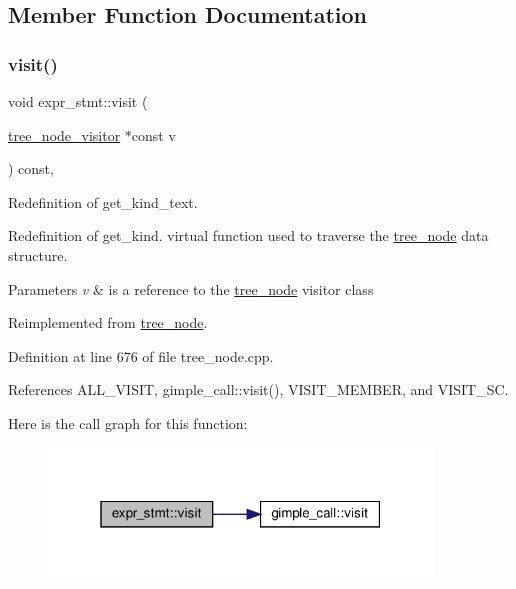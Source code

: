 \subsection{Member Function Documentation}
\mbox{\label{structexpr__stmt_a2d0ca76e32e1bdf477e4f033fa6c8f92}} 
\subsubsection{\texorpdfstring{visit()}{visit()}}
{\footnotesize\ttfamily void expr\+\_\+stmt\+::visit (\begin{DoxyParamCaption}\item[{\hyperlink{classtree__node__visitor}{tree\+\_\+node\+\_\+visitor} $\ast$const}]{v }\end{DoxyParamCaption}) const\hspace{0.3cm}{\ttfamily [override]}, {\ttfamily [virtual]}}



Redefinition of get\+\_\+kind\+\_\+text. 

Redefinition of get\+\_\+kind. virtual function used to traverse the \hyperlink{classtree__node}{tree\+\_\+node} data structure. 
\begin{DoxyParams}{Parameters}
{\em v} & is a reference to the \hyperlink{classtree__node}{tree\+\_\+node} visitor class \\
\hline
\end{DoxyParams}


Reimplemented from \hyperlink{classtree__node_aa9abba3f1b30e0be80b4a56b188c6ecc}{tree\+\_\+node}.



Definition at line 676 of file tree\+\_\+node.\+cpp.



References A\+L\+L\+\_\+\+V\+I\+S\+IT, gimple\+\_\+call\+::visit(), V\+I\+S\+I\+T\+\_\+\+M\+E\+M\+B\+ER, and V\+I\+S\+I\+T\+\_\+\+SC.

Here is the call graph for this function\+:
\nopagebreak
\begin{figure}[H]
\begin{center}
\leavevmode
\includegraphics[width=289pt]{dc/d7d/structexpr__stmt_a2d0ca76e32e1bdf477e4f033fa6c8f92_cgraph}
\end{center}
\end{figure}


